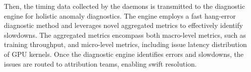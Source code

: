 Then, the timing data collected by the daemons is transmitted to the diagnostic engine for holistic anomaly diagnostics. The engine employs a fast hang-error diagnostic method and leverages novel aggregated metrics to effectively identify slowdowns.
The aggregated metrics encompass both macro-level metrics, such as training throughput, and micro-level metrics, including issue latency distribution of GPU kernels. 
Once the diagnostic engine identifies errors and slowdowns, the issues are routed to attribution teams, enabling swift resolution.


